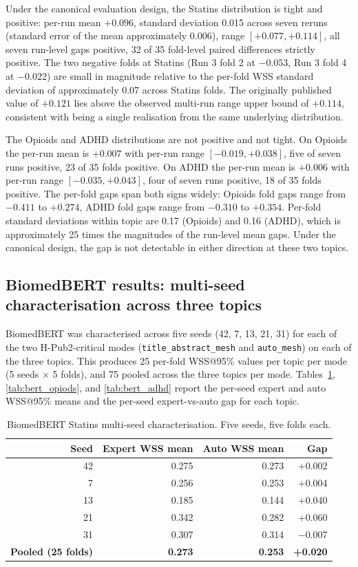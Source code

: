 \documentclass{article}
\begin{document}
Under the canonical evaluation design, the Statins distribution is tight and positive: per-run mean $+0.096$, standard deviation 0.015 across seven reruns (standard error of the mean approximately 0.006), range $[+0.077, +0.114]$, all seven run-level gaps positive, 32 of 35 fold-level paired differences strictly positive. The two negative folds at Statins (Run 3 fold 2 at $-0.053$, Run 3 fold 4 at $-0.022$) are small in magnitude relative to the per-fold WSS standard deviation of approximately 0.07 across Statins folds. The originally published value of $+0.121$ lies above the observed multi-run range upper bound of $+0.114$, consistent with being a single realisation from the same underlying distribution.

The Opioids and ADHD distributions are not positive and not tight. On Opioids the per-run mean is $+0.007$ with per-run range $[-0.019, +0.038]$, five of seven runs positive, 23 of 35 folds positive. On ADHD the per-run mean is $+0.006$ with per-run range $[-0.035, +0.043]$, four of seven runs positive, 18 of 35 folds positive. The per-fold gaps span both signs widely: Opioids fold gaps range from $-0.411$ to $+0.274$, ADHD fold gaps range from $-0.310$ to $+0.354$. Per-fold standard deviations within topic are 0.17 (Opioids) and 0.16 (ADHD), which is approximately 25 times the magnitudes of the run-level mean gaps. Under the canonical design, the gap is not detectable in either direction at these two topics.

\subsection{BiomedBERT results: multi-seed characterisation across three topics}\label{sec:bert-results}

BiomedBERT was characterised across five seeds (42, 7, 13, 21, 31) for each of the two H-Pub2-critical modes (\texttt{title\_abstract\_mesh} and \texttt{auto\_mesh}) on each of the three topics. This produces 25 per-fold WSS@95\% values per topic per mode (5 seeds $\times$ 5 folds), and 75 pooled across the three topics per mode. Tables~\ref{tab:bert_statins}, \ref{tab:bert_opiods}, and \ref{tab:bert_adhd} report the per-seed expert and auto WSS@95\% means and the per-seed expert-vs-auto gap for each topic.

\begin{table}[h]
\centering
\small
\begin{tabular}{rrrr}
\toprule
Seed & Expert WSS mean & Auto WSS mean & Gap \\
\midrule
42 & 0.275 & 0.273 & +0.002 \\
7  & 0.256 & 0.253 & +0.004 \\
13 & 0.185 & 0.144 & +0.040 \\
21 & 0.342 & 0.282 & +0.060 \\
31 & 0.307 & 0.314 & $-$0.007 \\
\midrule
\textbf{Pooled (25 folds)} & \textbf{0.273} & \textbf{0.253} & \textbf{+0.020} \\
\bottomrule
\end{tabular}
\caption{BiomedBERT Statins multi-seed characterisation. Five seeds, five folds each.}
\label{tab:bert_statins}
\end{table}
\end{document}

